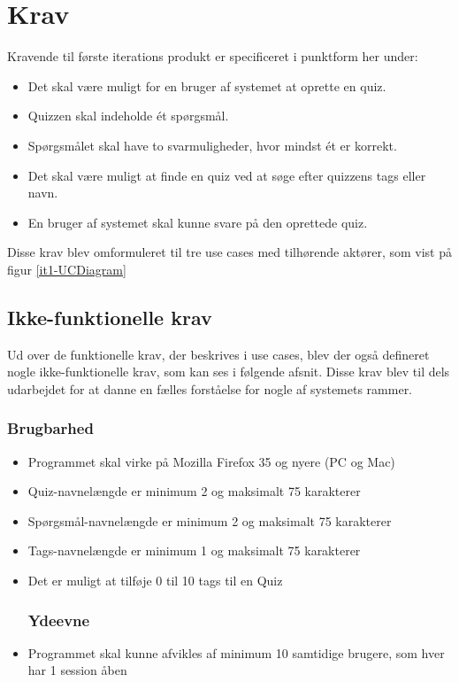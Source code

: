 \section{Krav}
Kravende til første iterations produkt er specificeret i punktform her under:

\begin{itemize}
	\item Det skal være muligt for en bruger af systemet at oprette en quiz.
	\item Quizzen skal indeholde ét spørgsmål.
	\item Spørgsmålet skal have to svarmuligheder, hvor mindst ét er korrekt.
	\item Det skal være muligt at finde en quiz ved at søge efter quizzens tags eller navn.
	\item En bruger af systemet skal kunne svare på den oprettede quiz.
\end{itemize}

Disse krav blev omformuleret til tre use cases med tilhørende aktører, som vist på figur \ref{it1-UCDiagram}


\subsection*{Ikke-funktionelle krav}
Ud over de funktionelle krav, der beskrives i use cases, blev der også defineret nogle ikke-funktionelle krav, som kan ses i følgende afsnit. Disse krav blev til dels udarbejdet for at danne en fælles forståelse for nogle af systemets rammer.

\subsubsection*{Brugbarhed}
\begin{itemize}
	\item Programmet skal virke på Mozilla Firefox 35 og nyere (PC og Mac)
	\item Quiz-navnelængde er minimum 2 og maksimalt 75 karakterer
	\item Spørgsmål-navnelængde er minimum 2 og maksimalt 75 karakterer
	\item Tags-navnelængde er minimum 1 og maksimalt 75 karakterer
	\item Det er muligt at tilføje 0 til 10 tags til en Quiz

\subsubsection*{Ydeevne}
	\item Programmet skal kunne afvikles af minimum 10 samtidige brugere, som hver har 1 session åben

\end{itemize}